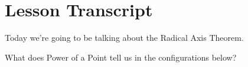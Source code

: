 \section{Lesson Transcript}

















Today we're going to be talking about the Radical Axis Theorem.

What does Power of a Point tell us in the configurations below?

